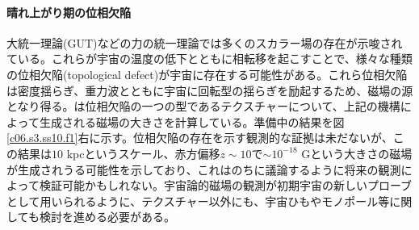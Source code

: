 \paragraph{晴れ上がり期の位相欠陥}

大統一理論(GUT)などの力の統一理論では多くのスカラー場の存在が示唆されている。これらが宇宙の温度の低下とともに相転移を起こすことで、様々な種類の位相欠陥(topological defect)が宇宙に存在する可能性がある。これら位相欠陥は密度揺らぎ、重力波とともに宇宙に回転型の揺らぎを励起するため、磁場の源となり得る。\cite{Horiguchi.et.al.2015}は位相欠陥の一つの型であるテクスチャーについて、上記の機構によって生成される磁場の大きさを計算している。準備中の結果を図\ref{c06.s3.ss10.f1}右に示す。位相欠陥の存在を示す観測的な証拠は未だないが、この結果は$10$ kpcというスケール、赤方偏移$z \sim 10$で$\sim 10^{-18}$ Gという大きさの磁場が生成されうる可能性を示しており、これはのちに議論するように将来の観測によって検証可能かもしれない。宇宙論的磁場の観測が初期宇宙の新しいプローブとして用いられるように、テクスチャー以外にも、宇宙ひもやモノポール等に関しても検討を進める必要がある。

